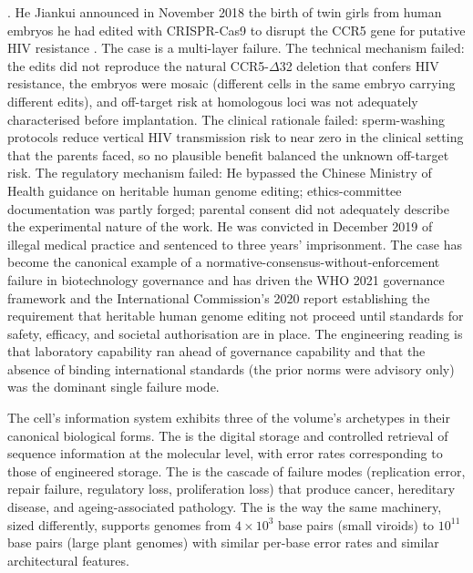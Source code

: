 . He Jiankui announced
in November 2018 the birth of twin girls from human embryos he had
edited with CRISPR-Cas9 to disrupt the CCR5 gene for putative HIV
resistance \cite{paper:v6c03-cyranoski-ledford-2018,
paper:v6c03-musunuru-2019, paper:v6c03-greely-2019,
paper:v6c03-who-genome-editing-2021, acc:he-jiankui-crispr-2018}. The
case is a multi-layer failure. The technical mechanism failed: the
edits did not reproduce the natural CCR5-$\Delta$32 deletion that
confers HIV resistance, the embryos were mosaic (different cells in
the same embryo carrying different edits), and off-target risk at
homologous loci was not adequately characterised before implantation.
The clinical rationale failed: sperm-washing protocols reduce vertical
HIV transmission risk to near zero in the clinical setting that
the parents faced, so no plausible benefit balanced the unknown
off-target risk. The regulatory mechanism failed: He bypassed the
Chinese Ministry of Health guidance on heritable human genome
editing; ethics-committee documentation was partly forged; parental
consent did not adequately describe the experimental nature of the
work. He was convicted in December 2019 of illegal medical practice
and sentenced to three years' imprisonment. The case has become the
canonical example of a normative-consensus-without-enforcement
failure in biotechnology governance and has driven the WHO 2021
governance framework and the International Commission's 2020 report
establishing the requirement that heritable human genome editing not
proceed until standards for safety, efficacy, and societal
authorisation are in place. The engineering reading is that
laboratory capability ran ahead of governance capability and that
the absence of binding international standards (the prior norms
were advisory only) was the dominant single failure mode.

\begin{archetype}
The cell's information system exhibits three of the volume's
archetypes in their canonical biological forms. The
 is the digital storage and
controlled retrieval of sequence information at the molecular level,
with error rates corresponding to those of engineered storage. The
 is the cascade of failure modes
(replication error, repair failure, regulatory loss, proliferation
loss) that produce cancer, hereditary disease, and ageing-associated
pathology. The  is the way the same
machinery, sized differently, supports genomes from $4 \times 10^3$
base pairs (small viroids) to $10^{11}$ base pairs (large plant
genomes) with similar per-base error rates and similar architectural
features.
\end{archetype}

